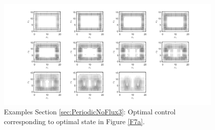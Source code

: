 \documentclass[11pt, a4paper]{article}
\theoremstyle{definition}
\begin{document}
\begin{figure}[h]
	\centering
	\includegraphics[scale=0.35]{ConOptPeri7.png}
	\caption{Examples Section \ref{sec:PeriodicNoFlux3}: Optimal control corresponding to optimal state in Figure \ref{F7a}.} 
	\label{F7b}
\end{figure}
\end{document}
